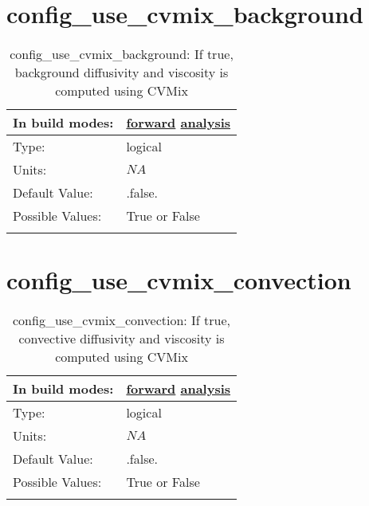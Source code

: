 \section[config\_use\_cvmix\_background]{config\_use\_cvmix\_background}
\label{sec:nm_sec_config_use_cvmix_background}
\begin{center}
\begin{longtable}{| p{2.0in} || p{4.0in} |}
    \hline
    In build modes: & \hyperref[subsec:forward_nm_tab_cvmix]{forward} \hyperref[subsec:analysis_nm_tab_cvmix]{analysis} \\
    \hline
    Type: & logical \\
    \hline
    Units: & $NA$ \\
    \hline
    Default Value: & .false. \\
    \hline
    Possible Values: & True or False \\
    \hline
    \caption{config\_use\_cvmix\_background: If true, background diffusivity and viscosity is computed using CVMix}
\end{longtable}
\end{center}
\section[config\_use\_cvmix\_convection]{config\_use\_cvmix\_convection}
\label{sec:nm_sec_config_use_cvmix_convection}
\begin{center}
\begin{longtable}{| p{2.0in} || p{4.0in} |}
    \hline
    In build modes: & \hyperref[subsec:forward_nm_tab_cvmix]{forward} \hyperref[subsec:analysis_nm_tab_cvmix]{analysis} \\
    \hline
    Type: & logical \\
    \hline
    Units: & $NA$ \\
    \hline
    Default Value: & .false. \\
    \hline
    Possible Values: & True or False \\
    \hline
    \caption{config\_use\_cvmix\_convection: If true, convective diffusivity and viscosity is computed using CVMix}
\end{longtable}
\end{center}
